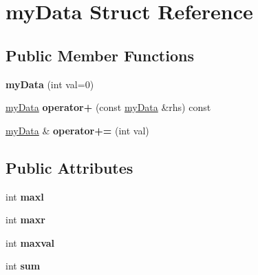 \hypertarget{structmy_data}{}\section{my\+Data Struct Reference}
\label{structmy_data}
\subsection*{Public Member Functions}
\begin{DoxyCompactItemize}
\item 
\mbox{\label{structmy_data_a22992d4bbfddc14ad12d4069b269a50b}} 
{\bfseries my\+Data} (int val=0)
\item 
\mbox{\label{structmy_data_adaac5b4acac584bb7aa6825eda0e39ad}} 
\mbox{\hyperlink{structmy_data}{my\+Data}} {\bfseries operator+} (const \mbox{\hyperlink{structmy_data}{my\+Data}} \&rhs) const
\item 
\mbox{\label{structmy_data_aa10baad3035db946125ed41bf4f04030}} 
\mbox{\hyperlink{structmy_data}{my\+Data}} \& {\bfseries operator+=} (int val)
\end{DoxyCompactItemize}
\subsection*{Public Attributes}
\begin{DoxyCompactItemize}
\item 
\mbox{\label{structmy_data_ac51385299e9ee98028da3ae72fbdc79f}} 
int {\bfseries maxl}
\item 
\mbox{\label{structmy_data_a0ff36e5ec40f817fe49ce7018467314a}} 
int {\bfseries maxr}
\item 
\mbox{\label{structmy_data_a123456dcaeae05a5c2c0a2e7276d98dc}} 
int {\bfseries maxval}
\item 
\mbox{\label{structmy_data_aa9a119fc05405e82b22994689b0a0ec5}} 
int {\bfseries sum}
\end{DoxyCompactItemize}
